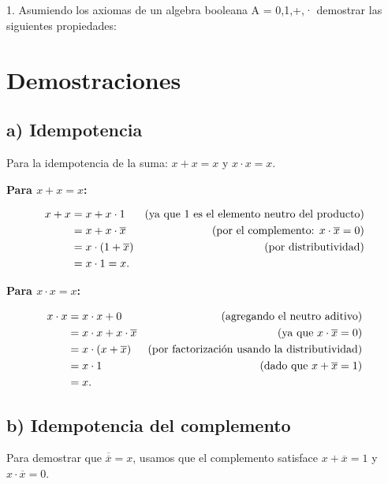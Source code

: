 \documentclass[11pt,letterpaper]{article}
\begin{document}
\section{} 1. Asumiendo los axiomas de un algebra booleana A = {{0,1},+,·} demostrar las
siguientes propiedades:
\section*{Demostraciones}

\subsection*{a) Idempotencia}

Para la idempotencia de la suma: \( x + x = x \) y \( x \cdot x = x \).

\textbf{Para \( x + x = x \):}

\[
\begin{aligned}
x + x &= x + x \cdot 1 & \text{(ya que 1 es el elemento neutro del producto)} \\
      &= x + x \cdot \overline{x} & \text{(por el complemento: \( x \cdot \overline{x} = 0 \))} \\
      &= x \cdot (1 + \overline{x}) & \text{(por distributividad)} \\
      &= x \cdot 1 = x.
\end{aligned}
\]

\textbf{Para \( x \cdot x = x \):}

\[
\begin{aligned}
x \cdot x &= x \cdot x + 0 & \text{(agregando el neutro aditivo)} \\
          &= x \cdot x + x \cdot \overline{x} & \text{(ya que \( x \cdot \overline{x} = 0 \))} \\
          &= x \cdot (x + \overline{x}) & \text{(por factorización usando la distributividad)} \\
          &= x \cdot 1 & \text{(dado que \( x + \overline{x} = 1 \))} \\
          &= x.
\end{aligned}
\]

\subsection*{b) Idempotencia del complemento}

Para demostrar que \( \overline{\overline{x}} = x \), usamos que el complemento satisface \( x + \overline{x} = 1 \) y \( x \cdot \overline{x} = 0 \).
\end{document}
